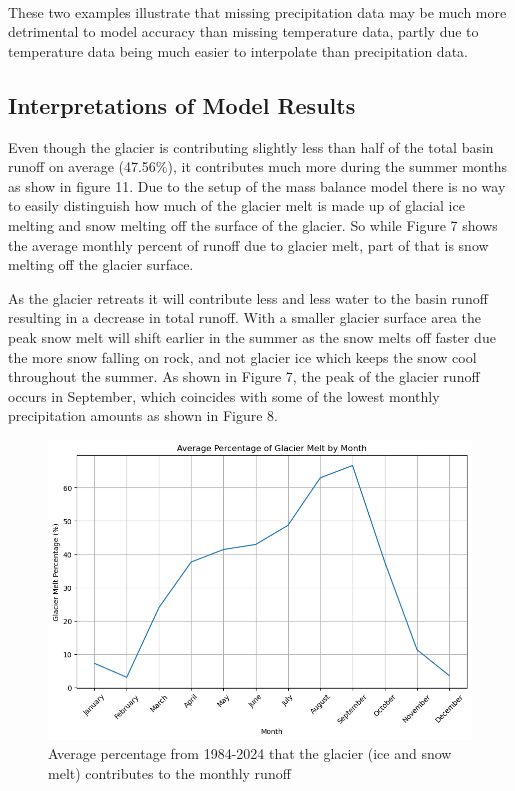 \documentclass{article}
\begin{document}
\paragraph{}
These two examples illustrate that missing precipitation data may be much more detrimental to model accuracy than missing temperature data, partly 
due to temperature data being much easier to interpolate than precipitation data.
\subsection{Interpretations of Model Results}
Even though the glacier is contributing slightly less than half of the total basin runoff on average (47.56\%), it contributes much more during the summer 
months as show in figure 11. Due to the setup of the mass balance model there is no way to easily distinguish how much of the glacier melt is made 
up of glacial ice melting and snow melting off the surface of the glacier. So while Figure 7 shows the average monthly percent of runoff due to glacier 
melt, part of that is snow melting off the glacier surface. 

As the glacier retreats it will contribute less and less water to the basin runoff resulting in a decrease in total runoff. With a smaller glacier 
surface area the peak snow melt will shift earlier in the summer as the snow melts off faster due the more snow falling on rock, and not glacier 
ice which keeps the snow cool throughout the summer. As shown in Figure 7, the peak of the glacier runoff occurs in September, which coincides 
with some of the lowest monthly precipitation amounts as shown in Figure 8.
\begin{figure}[h]
    \centering
    \includegraphics[width=\textwidth]{Plots/percent_glac_melt_month.png}
    \caption{Average percentage from 1984-2024 that the glacier (ice and snow melt) contributes to the monthly runoff}
    \label{fig:percent_glacier_runoff}
\end{figure}
\FloatBarrier\
\end{document}
